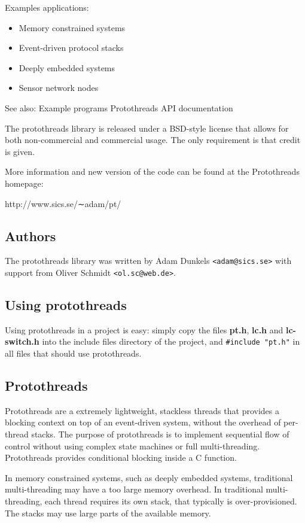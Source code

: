 \documentclass[12pt]{article}
\begin{document}
\begin{CJK}{UTF8}{bsmi}
Examples applications:

\begin{itemize}
\item Memory constrained systems
\item Event-driven protocol stacks
\item Deeply embedded systems
\item Sensor network nodes
\end{itemize}

See also:
Example programs
Protothreads API documentation

The protothreads library is released under a BSD-style license that allows for both non-commercial and commercial usage. The only requirement is that credit is given.

More information and new version of the code can be found at the Protothreads homepage:

http://www.sics.se/∼adam/pt/

\subsection{Authors}

The protothreads library was written by Adam Dunkels \verb+<adam@sics.se>+ with support from Oliver Schmidt \verb+<ol.sc@web.de>+.

\subsection{Using protothreads}

Using protothreads in a project is easy: simply copy the files {\bf pt.h}, {\bf lc.h} and {\bf lc-switch.h} into the include files directory of the project, and \verb+#include "pt.h"+ in all files that should use protothreads.

\subsection{Protothreads}

Protothreads are a extremely lightweight, stackless threads that provides a blocking context on top of an event-driven system, without the overhead of per-thread stacks. The purpose of protothreads is to implement sequential flow of control without using complex state machines or full multi-threading. Protothreads provides conditional blocking inside a C function.

In memory constrained systems, such as deeply embedded systems, traditional multi-threading may have a too large memory overhead. In traditional multi-threading, each thread requires its own stack, that typically is over-provisioned. The stacks may use large parts of the available memory.


\end{CJK}
\end{document}
